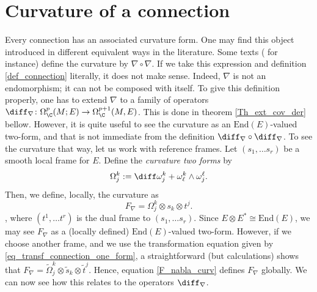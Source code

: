 \section{Curvature of a connection}
Every connection has an associated curvature form. One may find this object introduced in different equivalent ways in the literature. Some texts (\parencite{kobayashi_complex_vector_bundles} for instance) define the curvature by \(\nabla \circ \nabla\). If we take this expression and definition \ref{def_connection} literally, it does not make sense. Indeed, \(\nabla\) is not an endomorphism; it can not be composed with itself. To give this definition properly, one has to extend \(\nabla\) to a family of operators \(\diff_\nabla \colon \Omega_\C^p(M;E)\to \Omega_\C^{p+1}(M,E)\). This is done in theorem \ref{Th_ext_cov_der} bellow. However, it is quite useful to see the curvature as an \(\mathrm{End}(E)\)-valued two-form, and that is not immediate from the definition \(\diff_\nabla\circ \diff_\nabla\). To see the curvature that way, let us work with reference frames. Let \((s_1, \ldots s_r)\) be a smooth local frame for \(E\). Define the \textit{curvature two forms} by 
\begin{equation} \label{def_curv2_forms}
\Omega^k_j:=\diff \omega^k_j+ \omega^k_\ell\wedge \omega^\ell_j.
\end{equation}
Then, we define, locally, the curvature as
\begin{equation} \label{F_nabla_curv}
    F_\nabla = \Omega^k_j \otimes s_k \otimes t^j.
\end{equation}
, where \((t^1, \ldots t^r)\) is the dual frame to \((s_1, \ldots s_r)\). Since \(E \otimes E^*\cong \mathrm{End}(E)\), we may see \(F_\nabla\) as a (locally defined) \(\mathrm{End}(E)\)-valued two-form. However, if we choose another frame, and we use the transformation equation given by \eqref{eq_transf_connection_one_form}, a straightforward (but calculations) shows that \(F_\nabla=\tilde{\Omega}^k_j\otimes \tilde{s}_k\otimes \tilde{t}^j\). Hence, equation \eqref{F_nabla_curv} defines \(F_\nabla\) globally. We can now see how this relates to the operators \(\diff_\nabla\). 


